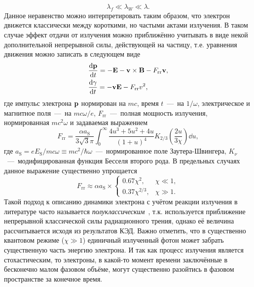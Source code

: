 \begin{equation}
    \lambda_f \ll \lambda_W \ll \lambda.
\end{equation}
Данное неравенство можно интерпретировать таким образом, что электрон движется классически между короткими, но частыми актами излучения.
В таком случае эффект отдачи от излучения можно приближённо учитывать в виде некой дополнительной непрерывной силы, действующей на частицу, т.е. уравнения движения можно записать в следующем виде
\begin{align}
    \label{eq:ch1/sec1/dpdt}
    & \dv{\vb{p}}{t} = -\vb{E} - \vb{v}\times\vb{B} - F_\mathrm{rr}\vb{v} ,\\
    \label{eq:ch1/sec1/dgdt}
    & \dv{\gamma}{t} = -\vb{v}\vb{E} - F_\mathrm{rr} v^2 ,
\end{align}
где импульс электрона $\vb{p}$ нормирован на $m c$, время $t$~---~на $1/\omega$, электрическое и магнитное поля~---~на $m c \omega / e$, $F_\mathrm{rr}$~---~полная мощность излучения, нормированная $mc^2\omega$ и задаваемая выражением
\begin{equation}
    F_\mathrm{rr} = \frac{\alpha a_\mathrm{S}}{3 \sqrt{3}\pi}
    \int_{0}^{\infty}\frac{4u^{3}+5u^2+4u}{(1+u)^{4}}K_{2/3}\left(\frac{2u}
    {3\chi}\right) \dd u,
\end{equation}
где $a_\mathrm{S} = eE_\mathrm{S}/mc\omega\equiv mc^2/\hbar\omega$~---~нормированное поле Заутера-Швингера, $K_\nu$~---~модифицированная функция Бесселя второго рода.
В предельных случаях данное выражение существенно упрощается
\begin{equation}
    F_\mathrm{rr} \approx \alpha a_\mathrm{S} \times
    \begin{cases}
        0.67 \chi^2, & \chi \ll 1, \\
        0.37 \chi^{2/3}, & \chi \gg 1.
    \end{cases}
\end{equation}
Такой подход к описанию динамики электрона с учётом реакции излучения в литературе часто называется \textit{полуклассическим}~\cite{kirk2009pair,bulanov2013electromagnetic,esirkepov2014attractors, niel2018quantum, gonoskov2021charged}, т.к. используется приближение непрерывной классической силы радиационного трения, однако её величина рассчитывается исходя из результатов КЭД.
Важно отметить, что в существенно квантовом режиме ($\chi \gg 1$) единичный излученный фотон может забрать существенную часть энергию электрона.
И так как процесс излучения является стохастическим, то электроны, в какой-то момент времени заключённые в бесконечно малом фазовом объёме, могут существенно разойтись в фазовом пространстве за конечное время.
